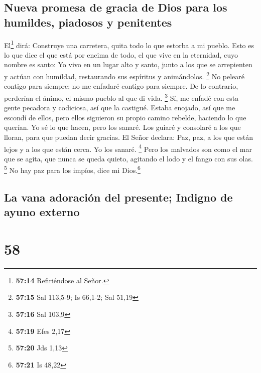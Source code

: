 \hypertarget{nueva-promesa-de-gracia-de-dios-para-los-humildes-piadosos-y-penitentes}{%
\subsection{Nueva promesa de gracia de Dios para los humildes, piadosos
y
penitentes}\label{nueva-promesa-de-gracia-de-dios-para-los-humildes-piadosos-y-penitentes}}

 El\footnote{\textbf{57:14} Refiriéndose al Señor.} dirá:
Construye una carretera, quita todo lo que estorba a mi pueblo.
 Esto es lo que dice el que está por encima de todo, el
que vive en la eternidad, cuyo nombre es santo: Yo vivo en un lugar alto
y santo, junto a los que se arrepienten y actúan con humildad,
restaurando sus espíritus y animándolos. \footnote{\textbf{57:15} Sal
  113,5-9; Is 66,1-2; Sal 51,19}  No pelearé contigo para
siempre; no me enfadaré contigo para siempre. De lo contrario, perderían
el ánimo, el mismo pueblo al que di vida. \footnote{\textbf{57:16} Sal
  103,9}  Sí, me enfadé con esta gente pecadora y
codiciosa, así que la castigué. Estaba enojado, así que me escondí de
ellos, pero ellos siguieron su propio camino rebelde, haciendo lo que
querían.  Yo sé lo que hacen, pero los sanaré. Los guiaré
y consolaré a los que lloran,  para que puedan decir
gracias. El Señor declara: Paz, paz, a los que están lejos y a los que
están cerca. Yo los sanaré. \footnote{\textbf{57:19} Efes 2,17}
 Pero los malvados son como el mar que se agita, que
nunca se queda quieto, agitando el lodo y el fango con sus olas.
\footnote{\textbf{57:20} Jds 1,13}  No hay paz para los
impíos, dice mi Dios.\footnote{\textbf{57:21} Is 48,22}

\hypertarget{la-vana-adoraciuxf3n-del-presente-indigno-de-ayuno-externo}{%
\subsection{La vana adoración del presente; Indigno de ayuno
externo}\label{la-vana-adoraciuxf3n-del-presente-indigno-de-ayuno-externo}}

\hypertarget{section-57}{%
\section{58}\label{section-57}}

